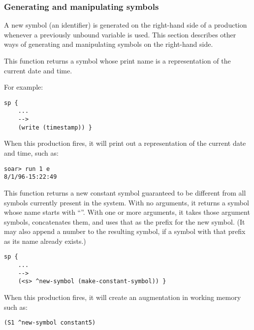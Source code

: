 \subsubsection{Generating and manipulating symbols}

A new symbol (an identifier) is generated on the right-hand side of a
production whenever a previously unbound variable is used. This section
describes other ways of generating and manipulating symbols on the right-hand
side. 

\begin{description}
\item [\soarb{timestamp} --- ] This function returns a symbol whose print name 
is a
        representation of the current date and time. 

        For example:

\begin{verbatim}
sp {
    ...
    -->
    (write (timestamp)) }
\end{verbatim}

        When this production fires, it will print out a representation of the
        current date and time, such as:
\begin{verbatim}
soar> run 1 e
8/1/96-15:22:49
\end{verbatim}    


\item [\soarb{make-constant-symbol} --- ] This function returns a new constant 
symbol
        guaranteed to be different from all symbols currently present in the
        system.  With no arguments, it returns a symbol whose name starts with
        ``''.  With one or more arguments, it takes those
        argument symbols, concatenates them, and uses that as the
        prefix for the new symbol. (It may also append a number to the 
	resulting symbol, 
	if a symbol with that prefix as its name already exists.)

\begin{verbatim}
sp {
    ...
    -->
    (<s> ^new-symbol (make-constant-symbol)) }
\end{verbatim}

        When this production fires, it will create an augmentation in working
        memory such as:

\begin{verbatim}
(S1 ^new-symbol constant5)
\end{verbatim} \vspace{12pt}


\end{description}
